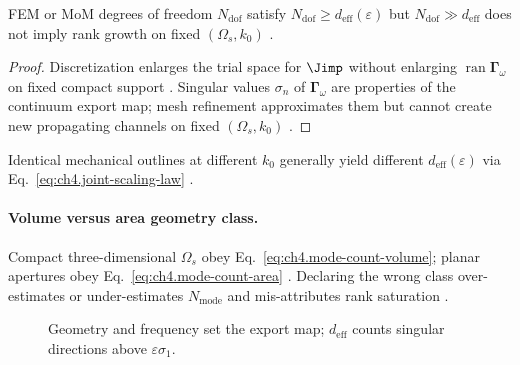 \begin{lemma}
\label{lem:ch4.mesh-dof-trap}
FEM or MoM degrees of freedom \(N_{\mathrm{dof}}\) satisfy \(N_{\mathrm{dof}}\ge d_{\mathrm{eff}}(\varepsilon)\) but \(N_{\mathrm{dof}}\gg d_{\mathrm{eff}}\)
does not imply rank growth on fixed \((\Omega_{s},k_{0})\) \cite{harrington2001,devaney2004,hansen1988,stratton1941}.
\end{lemma}
\begin{proof}
Discretization enlarges the trial space for \(\Jimp\) without enlarging \(\operatorname{ran}\boldsymbol{\Gamma}_\omega\) on fixed compact support
\cite{harrington2001,stratton1941}. Singular values \(\sigma_{n}\) of \(\boldsymbol{\Gamma}_\omega\) are properties of the continuum export map;
mesh refinement approximates them but cannot create new propagating channels on fixed \((\Omega_{s},k_{0})\) \cite{devaney2004,hansen1988}.
\end{proof}

\begin{corollary}
\label{cor:ch4.cad-rank-decouple}
Identical mechanical outlines at different \(k_{0}\) generally yield different \(d_{\mathrm{eff}}(\varepsilon)\) via Eq.~\eqref{eq:ch4.joint-scaling-law}
\cite{jackson1999,harrington2001,hansen1988,stratton1941,devaney2004}.
\end{corollary}

\paragraph{Volume versus area geometry class.}
Compact three-dimensional \(\Omega_{s}\) obey Eq.~\eqref{eq:ch4.mode-count-volume}; planar apertures obey Eq.~\eqref{eq:ch4.mode-count-area}
\cite{collin2001,jackson1999,hansen1988}. Declaring the wrong class over-estimates or under-estimates \(N_{\mathrm{mode}}\) and mis-attributes rank
saturation \cite{stratton1941,harrington2001,devaney2004}.

\begin{figure}[t]
\centering
{}
\caption{Geometry and frequency set the export map; \(d_{\mathrm{eff}}\) counts singular directions above \(\varepsilon\sigma_{1}\).}
\label{fig:ch4.geometry-rank-map}
\end{figure}

